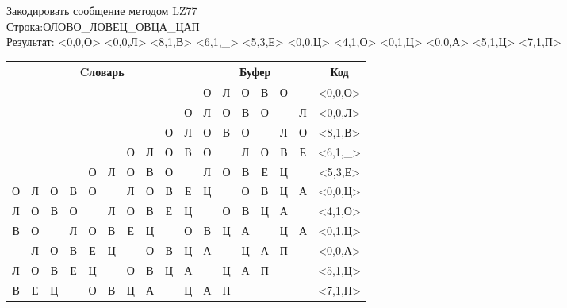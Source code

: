 \documentclass[a4paper, 12pt]{article}
\begin{document}
Закодировать сообщение методом LZ77\\
Строка:ОЛОВО\_ЛОВЕЦ\_ОВЦА\_ЦАП\\
Результат: <0,0,О> <0,0,Л> <8,1,В> <6,1,\_> <5,3,Е> <0,0,Ц> <4,1,О> <0,1,Ц> <0,0,А> <5,1,Ц> <7,1,П>\\
\begin{table}[h!]
\centering
\begin{tabular}{|c|c|c|c|c|c|c|c|c|c|c|c|c|c|c|c|c|} 
\hline
\multicolumn{10}{|c|}{Cловарь} & \multicolumn{6}{c|}{Буфер} & Код  \\ \hline
  &   &   &   &   &   &   &   &   &   & \cellcolor[HTML]{8CE4F6} О & Л & О & В & О &   & <0,0,О>
\\ \hline
  &   &   &   &   &   &   &   &   & О & \cellcolor[HTML]{8CE4F6} Л & О & В & О &   & Л & <0,0,Л>
\\ \hline
  &   &   &   &   &   &   &   & \cellcolor[HTML]{FFFF00} О & Л & \cellcolor[HTML]{FFFF00} О & \cellcolor[HTML]{8CE4F6} В & О &   & Л & О & <8,1,В>
\\ \hline
  &   &   &   &   &   & \cellcolor[HTML]{FFFF00} О & Л & О & В & \cellcolor[HTML]{FFFF00} О & \cellcolor[HTML]{8CE4F6}   & Л & О & В & Е & <6,1,\_>
\\ \hline
  &   &   &   & О & \cellcolor[HTML]{FFFF00} Л & \cellcolor[HTML]{FFFF00} О & \cellcolor[HTML]{FFFF00} В & О &   & \cellcolor[HTML]{FFFF00} Л & \cellcolor[HTML]{FFFF00} О & \cellcolor[HTML]{FFFF00} В & \cellcolor[HTML]{8CE4F6} Е & Ц &   & <5,3,Е>
\\ \hline
О & Л & О & В & О &   & Л & О & В & Е & \cellcolor[HTML]{8CE4F6} Ц &   & О & В & Ц & А & <0,0,Ц>
\\ \hline
Л & О & В & О & \cellcolor[HTML]{FFFF00}   & Л & О & В & Е & Ц & \cellcolor[HTML]{FFFF00}   & \cellcolor[HTML]{8CE4F6} О & В & Ц & А &   & <4,1,О>
\\ \hline
\cellcolor[HTML]{FFFF00} В & О &   & Л & О & В & Е & Ц &   & О & \cellcolor[HTML]{FFFF00} В & \cellcolor[HTML]{8CE4F6} Ц & А &   & Ц & А & <0,1,Ц>
\\ \hline
  & Л & О & В & Е & Ц &   & О & В & Ц & \cellcolor[HTML]{8CE4F6} А &   & Ц & А & П &   & <0,0,А>
\\ \hline
Л & О & В & Е & Ц & \cellcolor[HTML]{FFFF00}   & О & В & Ц & А & \cellcolor[HTML]{FFFF00}   & \cellcolor[HTML]{8CE4F6} Ц & А & П &   &   & <5,1,Ц>
\\ \hline
В & Е & Ц &   & О & В & Ц & \cellcolor[HTML]{FFFF00} А &   & Ц & \cellcolor[HTML]{FFFF00} А & \cellcolor[HTML]{8CE4F6} П &   &   &   &   & <7,1,П>
\\ \hline
\end{tabular}
\end{table}
\end{document}
